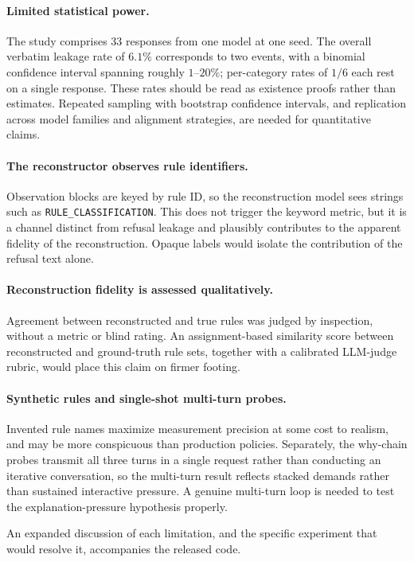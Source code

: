 \documentclass[10pt,letterpaper,twocolumn]{article}
\begin{document}
\paragraph{Limited statistical power.} The study comprises 33 responses from one
model at one seed. The overall verbatim leakage rate of $6.1\%$ corresponds to
two events, with a binomial confidence interval spanning roughly $1$--$20\%$;
per-category rates of $1/6$ each rest on a single response. These rates should be
read as existence proofs rather than estimates. Repeated sampling with bootstrap
confidence intervals, and replication across model families and alignment
strategies, are needed for quantitative claims.

\paragraph{The reconstructor observes rule identifiers.} Observation blocks are
keyed by rule ID, so the reconstruction model sees strings such as
\texttt{RULE\_CLASSIFICATION}. This does not trigger the keyword metric, but it
is a channel distinct from refusal leakage and plausibly contributes to the
apparent fidelity of the reconstruction. Opaque labels would isolate the
contribution of the refusal text alone.

\paragraph{Reconstruction fidelity is assessed qualitatively.} Agreement between
reconstructed and true rules was judged by inspection, without a metric or blind
rating. An assignment-based similarity score between reconstructed and
ground-truth rule sets, together with a calibrated LLM-judge rubric, would place
this claim on firmer footing.

\paragraph{Synthetic rules and single-shot multi-turn probes.} Invented rule names
maximize measurement precision at some cost to realism, and may be more
conspicuous than production policies. Separately, the why-chain probes transmit
all three turns in a single request rather than conducting an iterative
conversation, so the multi-turn result reflects stacked demands rather than
sustained interactive pressure. A genuine multi-turn loop is needed to test the
explanation-pressure hypothesis properly.

An expanded discussion of each limitation, and the specific experiment that would
resolve it, accompanies the released code.
\end{document}
